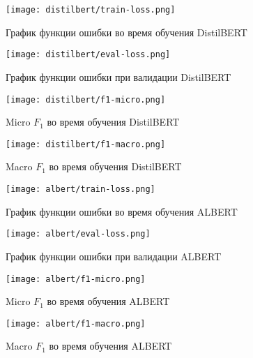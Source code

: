 \begin{figure}[!htb] 
   \begin{minipage}{0.48\textwidth} 
     \centering 
     \texttt{[image: distilbert/train-loss.png]}
     \caption{График функции ошибки во время обучения DistilBERT} 
   \end{minipage}\hfill 
   \begin{minipage}{0.48\textwidth} 
     \centering 
     \texttt{[image: distilbert/eval-loss.png]}
     \caption{График функции ошибки при валидации DistilBERT} 
   \end{minipage} 
\end{figure}

\begin{figure}[!htb] 
   \begin{minipage}{0.48\textwidth} 
     \centering 
     \texttt{[image: distilbert/f1-micro.png]}
     \caption{Micro $F_1$ во время обучения DistilBERT} 
   \end{minipage}\hfill 
   \begin{minipage}{0.48\textwidth} 
     \centering 
     \texttt{[image: distilbert/f1-macro.png]}
     \caption{Macro $F_1$ во время обучения DistilBERT} 
   \end{minipage} 
\end{figure}

\begin{figure}[!htb] 
   \begin{minipage}{0.48\textwidth} 
     \centering 
     \texttt{[image: albert/train-loss.png]}
     \caption{График функции ошибки во время обучения ALBERT} 
   \end{minipage}\hfill 
   \begin{minipage}{0.48\textwidth} 
     \centering 
     \texttt{[image: albert/eval-loss.png]}
     \caption{График функции ошибки при валидации ALBERT} 
   \end{minipage} 
\end{figure}

\begin{figure}[!htb] 
   \begin{minipage}{0.48\textwidth} 
     \centering 
     \texttt{[image: albert/f1-micro.png]}
     \caption{Micro $F_1$ во время обучения ALBERT} 
   \end{minipage}\hfill 
   \begin{minipage}{0.48\textwidth} 
     \centering 
     \texttt{[image: albert/f1-macro.png]}
     \caption{Macro $F_1$ во время обучения ALBERT} 
   \end{minipage} 
\end{figure}


